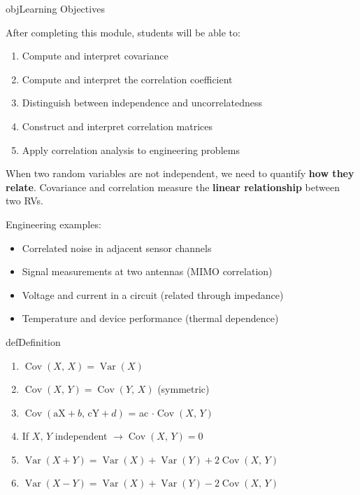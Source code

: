 \begin{PSbox}[unbreakable]{obj}{Learning Objectives}

After completing this module, students will be able to:

\begin{enumerate}
\def\labelenumi{\arabic{enumi}.}
\tightlist
\item
  Compute and interpret covariance
\item
  Compute and interpret the correlation coefficient
\item
  Distinguish between independence and uncorrelatedness
\item
  Construct and interpret correlation matrices
\item
  Apply correlation analysis to engineering problems
\end{enumerate}

\end{PSbox}


When two random variables are not independent, we need to quantify \textbf{how they relate}. Covariance and correlation measure the \textbf{linear relationship} between two RVs.

Engineering examples:

\begin{itemize}
\tightlist
\item
  Correlated noise in adjacent sensor channels
\item
  Signal measurements at two antennas (MIMO correlation)
\item
  Voltage and current in a circuit (related through impedance)
\item
  Temperature and device performance (thermal dependence)
\end{itemize}


\begin{PSbox}[unbreakable]{def}{Definition}


\end{PSbox}


\begin{enumerate}
\def\labelenumi{\arabic{enumi}.}
\tightlist
\item
  $\operatorname{Cov}(X,\, X) = \operatorname{Var}(X)$
\item
  $\operatorname{Cov}(X,\, Y) = \operatorname{Cov}(Y,\, X)$ (symmetric)
\item
  $\operatorname{Cov}(\text{aX} + b,\, \text{cY} + d)$ = ac $\cdot \operatorname{Cov}(X,\, Y)$
\item
  If $X,\, Y$ independent $\to \operatorname{Cov}(X,\, Y) = 0$
\item
  $\operatorname{Var}(X + Y) = \operatorname{Var}(X) + \operatorname{Var}(Y) + 2\operatorname{Cov}(X,\, Y)$
\item
  $\operatorname{Var}(X - Y) = \operatorname{Var}(X) + \operatorname{Var}(Y) - 2\operatorname{Cov}(X,\, Y)$
\end{enumerate}

